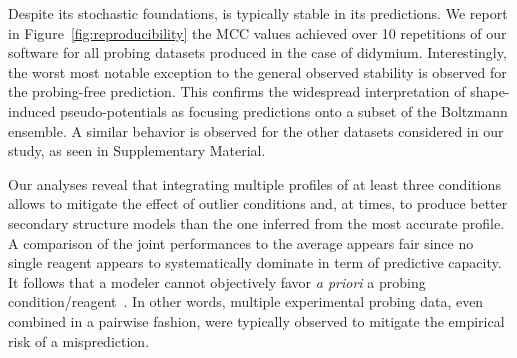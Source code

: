\documentclass[a4,center,fleqn]{NAR}
\newcommand{\Software}[1]{\text{\ttfamily\bfseries #1}}
\newcommand{\OurTool}{\Software{IPANEMAP}\xspace}
\begin{document}
Despite its stochastic foundations, \OurTool{} is typically stable in its predictions. We report in Figure~\ref{fig:reproducibility} the MCC values achieved over  10 repetitions of our software for all probing datasets produced in the case of didymium. 
Interestingly, the worst most notable exception to the general observed stability is observed for the probing-free prediction. This confirms the widespread interpretation of shape-induced pseudo-potentials as focusing predictions onto a subset of the Boltzmann ensemble. A similar behavior is observed for the other datasets considered in our study, as seen in Supplementary Material. %



Our analyses reveal that integrating multiple profiles of at least three conditions allows to mitigate the effect of outlier conditions and, at times, to produce better secondary structure models than the one inferred from the most accurate profile. A comparison of the joint performances to the average appears fair since no single reagent appears to systematically dominate in term of predictive capacity. It follows that a modeler cannot objectively favor \emph{a priori} a probing condition/reagent~\cite{Yu2018}. In other words, multiple experimental probing data, even combined in a pairwise fashion, were typically observed to mitigate the empirical risk of a misprediction. 
\end{document}

